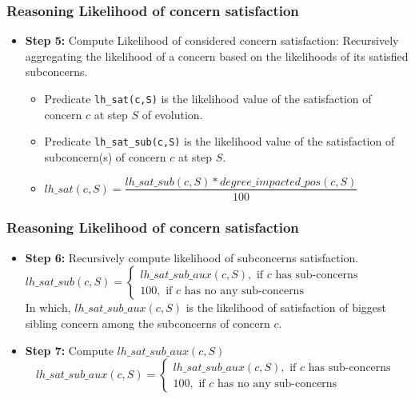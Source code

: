 \documentclass{beamer}
\begin{document}
\begin{frame}[fragile]
	\frametitle{Reasoning Likelihood of concern satisfaction}
	\begin{itemize}
		\item {\bf Step 5:}  Compute Likelihood of considered concern satisfaction: Recursively aggregating the likelihood of a concern based on the likelihoods of its satisfied subconcerns. 
		\begin{itemize}
			\item Predicate {\tt lh\_sat(c,S)} is the likelihood value of the satisfaction of concern $c$ at step $S$ of evolution. 
			\item Predicate {\tt lh\_sat\_sub(c,S)} is the likelihood value of the satisfaction of subconcern(s) of concern $c$ at step $S$.
			\item 
			$
			lh\_sat(c,S) = 	\dfrac{lh\_sat\_sub(c,S)*degree\_impacted\_pos(c,S)}{100}
			$
		\end{itemize}
	\end{itemize}
\end{frame}

\begin{frame}[fragile]
	\frametitle{Reasoning Likelihood of concern satisfaction}
	\begin{itemize}
		\item {\bf Step 6:}  Recursively compute likelihood of subconcerns satisfaction. 
		$
		lh\_sat\_sub(c,S) = 
		\begin{cases}
		lh\_sat\_sub\_aux(c,S), \text{ if } c \text{ has sub-concerns } \\
		100, \text{ if } c \text{ has no any sub-concerns}  
		\end{cases} 
		$
		\\
		In which, $lh\_sat\_sub\_aux(c,S)$ is the likelihood of satisfaction of biggest sibling concern among the subconcerns of concern $c$.
		\item {\bf Step 7:} Compute $lh\_sat\_sub\_aux(c,S)$
		$$
		lh\_sat\_sub\_aux(c,S) = 
		\begin{cases}
		lh\_sat\_sub\_aux(c,S), \text{ if } c \text{ has sub-concerns } \\
		100, \text{ if } c \text{ has no any sub-concerns}  
		\end{cases} 
		$$
	\end{itemize}
\end{frame}
%
        
\end{document}
